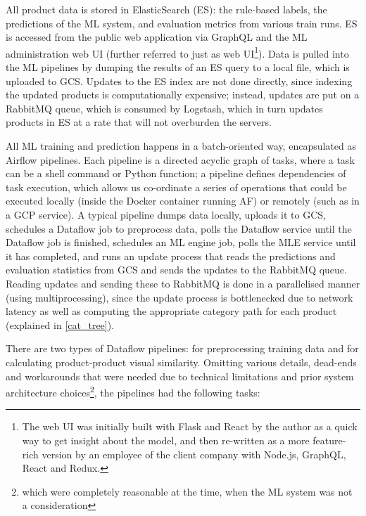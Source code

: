 All product data is stored in ElasticSearch (ES): the rule-based labels, the predictions of the ML system, and evaluation metrics from various train runs.
ES is accessed from the public web application via GraphQL and the ML administration web UI (further referred to just as web UI\footnote{The web UI was initially built with Flask and React by the author as a quick way to get insight about the model, and then re-written as a more feature-rich version by an employee of the client company with Node.js, GraphQL, React and Redux.}).
Data is pulled into the ML pipelines by dumping the results of an ES query to a local file, which is uploaded to GCS.
Updates to the ES index are not done directly, since indexing the updated products is computationally expensive; instead, updates are put on a RabbitMQ queue, which is consumed by Logstash, which in turn updates products in ES at a rate that will not overburden the servers.

All ML training and prediction happens in a batch-oriented way, encapsulated as Airflow pipelines.
Each pipeline is a directed acyclic graph of tasks, where a task can be a shell command or Python function; a pipeline defines dependencies of task execution, which allows us co-ordinate a series of operations that could be executed locally (inside the Docker container running AF) or remotely (such as in a GCP service).
A typical pipeline dumps data locally, uploads it to GCS, schedules a Dataflow job to preprocess data, polls the Dataflow service until the Dataflow job is finished, schedules an ML engine job, polls the MLE service until it has completed, and runs an update process that reads the predictions and evaluation statistics from GCS and sends the updates to the RabbitMQ queue.
Reading updates and sending these to RabbitMQ is done in a parallelised manner (using multiprocessing), since the update process is bottlenecked due to network latency as well as computing the appropriate category path for each product (explained in \ref{cat_tree}).

There are two types of Dataflow pipelines: for preprocessing training data and for calculating product-product visual similarity. Omitting various details, dead-ends and workarounds that were needed due to technical limitations and prior system architecture choices\footnote{which were completely reasonable at the time, when the ML system was not a consideration}, the pipelines had the following tasks:

